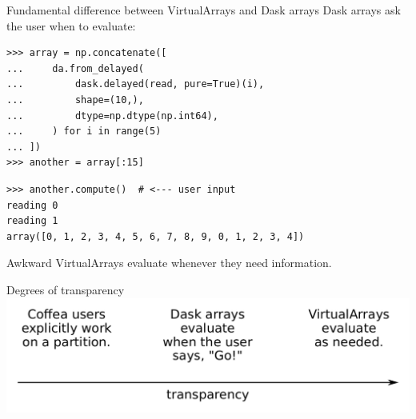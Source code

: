 \documentclass[aspectratio=169]{beamer}
\begin{document}
\begin{frame}[fragile]{Fundamental difference between VirtualArrays and Dask arrays}
\Large
\vspace{0.25 cm}
Dask arrays ask the user when to evaluate:

\small
\begin{verbatim}
>>> array = np.concatenate([
...     da.from_delayed(
...         dask.delayed(read, pure=True)(i),
...         shape=(10,),
...         dtype=np.dtype(np.int64),
...     ) for i in range(5)
... ])
>>> another = array[:15]
\end{verbatim}
\begin{verbatim}
>>> another.compute()  # <--- user input
reading 0
reading 1
array([0, 1, 2, 3, 4, 5, 6, 7, 8, 9, 0, 1, 2, 3, 4])
\end{verbatim}

\Large
\vspace{0.5 cm}
Awkward VirtualArrays evaluate whenever they need information.
\end{frame}

\begin{frame}{Degrees of transparency}
\vspace{1 cm}
\includegraphics[width=\linewidth]{degrees-of-transparency.pdf}
\end{frame}
\end{document}
